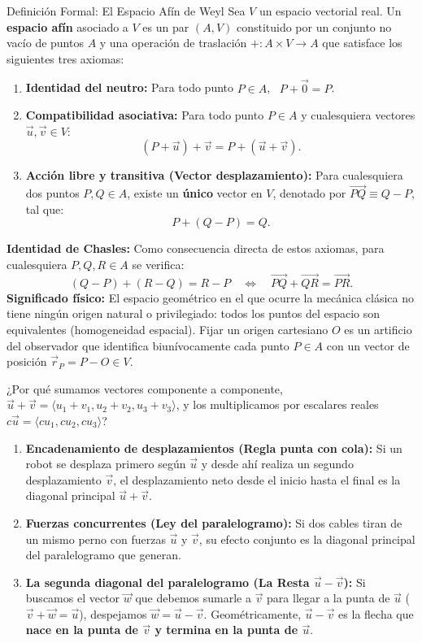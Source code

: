 \documentclass[11pt,letterpaper]{article}
\begin{document}
\begin{theorembox}{Definición Formal: El Espacio Afín de Weyl}
Sea $V$ un espacio vectorial real. Un \textbf{espacio afín} asociado a $V$ es un par $(A, V)$ constituido por un conjunto no vacío de puntos $A$ y una operación de traslación $+: A \times V \to A$ que satisface los siguientes tres axiomas:
\begin{enumerate}
    \item \textbf{Identidad del neutro:} Para todo punto $P \in A$, \ $P + \vec{0} = P$.
    \item \textbf{Compatibilidad asociativa:} Para todo punto $P \in A$ y cualesquiera vectores $\vec{u}, \vec{v} \in V$:
    \[
    (P + \vec{u}) + \vec{v} = P + (\vec{u} + \vec{v}).
    \]
    \item \textbf{Acción libre y transitiva (Vector desplazamiento):} Para cualesquiera dos puntos $P, Q \in A$, existe un \textbf{único} vector en $V$, denotado por $\overrightarrow{PQ} \equiv Q - P$, tal que:
    \[
    P + (Q - P) = Q.
    \]
\end{enumerate}
\textbf{Identidad de Chasles:} Como consecuencia directa de estos axiomas, para cualesquiera $P, Q, R \in A$ se verifica:
\[
(Q - P) + (R - Q) = R - P \quad \Longleftrightarrow \quad \overrightarrow{PQ} + \overrightarrow{QR} = \overrightarrow{PR}.
\]
\textbf{Significado físico:} El espacio geométrico en el que ocurre la mecánica clásica no tiene ningún origen natural o privilegiado: todos los puntos del espacio son equivalentes (homogeneidad espacial). Fijar un origen cartesiano $O$ es un artificio del observador que identifica biunívocamente cada punto $P \in A$ con un vector de posición $\vec{r}_P = P - O \in V$.
\end{theorembox}

¿Por qué sumamos vectores componente a componente, $\vec{u} + \vec{v} = \langle u_1+v_1, u_2+v_2, u_3+v_3 \rangle$, y los multiplicamos por escalares reales $c\vec{u} = \langle c u_1, c u_2, c u_3 \rangle$?
\begin{enumerate}
    \item \textbf{Encadenamiento de desplazamientos (Regla punta con cola):} Si un robot se desplaza primero según $\vec{u}$ y desde ahí realiza un segundo desplazamiento $\vec{v}$, el desplazamiento neto desde el inicio hasta el final es la diagonal principal $\vec{u} + \vec{v}$.
    \item \textbf{Fuerzas concurrentes (Ley del paralelogramo):} Si dos cables tiran de un mismo perno con fuerzas $\vec{u}$ y $\vec{v}$, su efecto conjunto es la diagonal principal del paralelogramo que generan.
    \item \textbf{La segunda diagonal del paralelogramo (La Resta $\vec{u} - \vec{v}$):} Si buscamos el vector $\vec{w}$ que debemos sumarle a $\vec{v}$ para llegar a la punta de $\vec{u}$ ($\vec{v} + \vec{w} = \vec{u}$), despejamos $\vec{w} = \vec{u} - \vec{v}$. Geométricamente, $\vec{u} - \vec{v}$ es la flecha que \textbf{nace en la punta de $\vec{v}$ y termina en la punta de $\vec{u}$}.
\end{enumerate}
\end{document}
